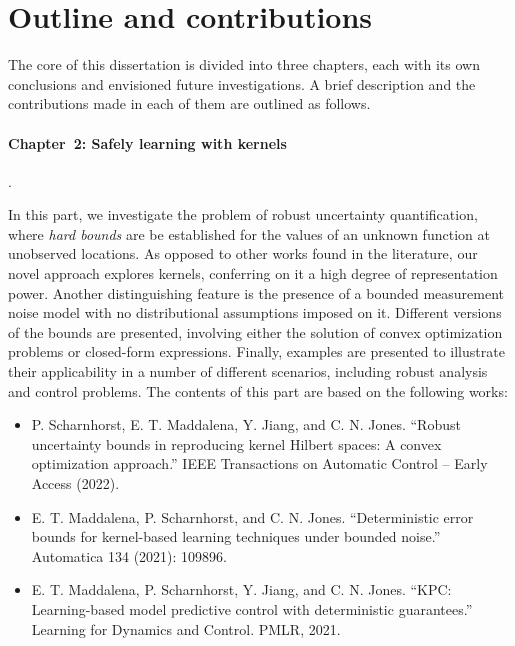 


\section{Outline and contributions}

The core of this dissertation is divided into three chapters, each with its own conclusions and envisioned future investigations. A brief description and the contributions made in each of them are outlined as follows.

\paragraph{Chapter~2: Safely learning with kernels}. 

In this part, we investigate the problem of robust uncertainty quantification, where \textit{hard bounds} are be established for the values of an unknown function at unobserved locations. As opposed to other works found in the literature, our novel approach explores kernels, conferring on it a high degree of representation power. Another distinguishing feature is the presence of a bounded measurement noise model with no distributional assumptions imposed on it. Different versions of the bounds are presented, involving either the solution of convex optimization problems or closed-form expressions. Finally, examples are presented to illustrate their applicability in a number of different scenarios, including robust analysis and control problems. The contents of this part are based on the following works:
\begin{itemize}
	\item P. Scharnhorst, E. T. Maddalena, Y. Jiang, and C. N. Jones. ``Robust uncertainty bounds in reproducing kernel Hilbert spaces: A convex optimization approach.'' IEEE Transactions on Automatic Control -- Early Access (2022).
	
	\item E. T. Maddalena, P. Scharnhorst, and C. N. Jones. ``Deterministic error bounds for kernel-based learning techniques under bounded noise.'' Automatica 134 (2021): 109896.
		
	\item E. T. Maddalena, P. Scharnhorst, Y. Jiang, and C. N. Jones. ``KPC: Learning-based model predictive control with deterministic guarantees.'' Learning for Dynamics and Control. PMLR, 2021.
\end{itemize}

